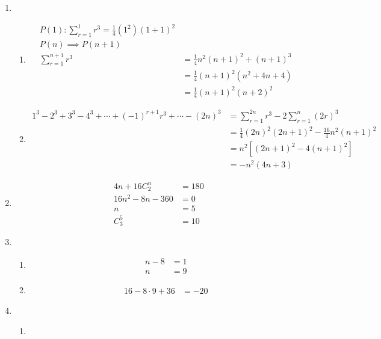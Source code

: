 \documentclass[12pt]{article}
\begin{document}
    \begin{enumerate}
        \item \begin{enumerate}
            \item \begin{align*}
                P(1):\sum_{r=1}^1 r^3=\frac{1}{4}(1^2)(1+1)^2\\
                P(n)\implies P(n+1)\\
                \sum_{r=1}^{n+1}r^3&=\frac{1}{4}n^2(n+1)^2+(n+1)^3\\
                &=\frac{1}{4}(n+1)^2(n^2+4n+4)\\
                &=\frac{1}{4}(n+1)^2(n+2)^2
            \end{align*}
            \item \begin{align*}
                1^3-2^3+3^3-4^3+\cdots+(-1)^{r+1}r^3+\cdots-(2n)^3&=\sum_{r=1}^{2n}r^3-2\sum_{r=1}^n(2r)^3\\
                &=\frac{1}{4}(2n)^2(2n+1)^2-\frac{16}{4}n^2(n+1)^2\\
                &=n^2[(2n+1)^2-4(n+1)^2]\\
                &=-n^2(4n+3)
            \end{align*}
        \end{enumerate}
        \item \begin{align*}
            4n+16C_2^n&=180\\
            16n^2-8n-360&=0\\
            n&=5\\
            C_3^5&=10
        \end{align*}
        \item \begin{enumerate}
            \item \begin{align*}
                n-8&=1\\
                n&=9
            \end{align*}
            \item \begin{align*}
                16-8\cdot9+36&=-20
            \end{align*}
        \end{enumerate}
        \item \begin{enumerate}
            \item \begin{align*}

\end{align*}
\end{enumerate}
\end{enumerate}
\end{document}
